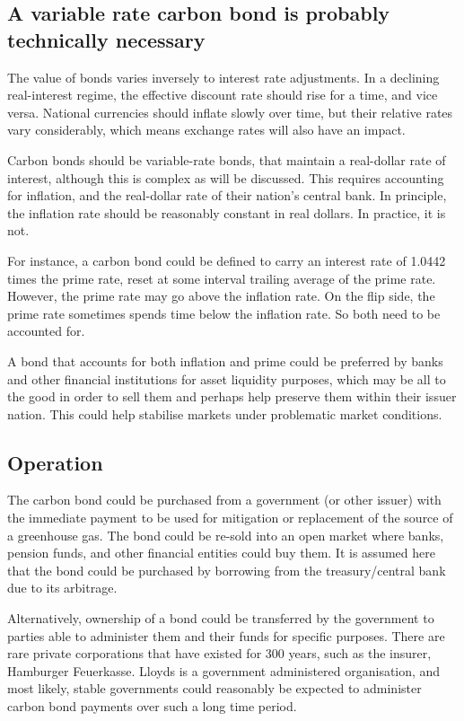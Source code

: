 \documentclass{article}
\begin{document}
\subsection{A variable rate carbon bond is probably technically necessary}

The value of bonds varies inversely to interest rate adjustments. In a declining real-interest regime, the effective discount rate should rise for a time, and vice versa. National currencies should inflate slowly over time, but their relative rates vary considerably, which means exchange rates will also have an impact. 

Carbon bonds should be variable-rate bonds, that maintain a real-dollar rate of interest, although this is complex as will be discussed. This requires accounting for inflation, and the real-dollar rate of  their nation's central bank. In  principle, the inflation rate should be reasonably constant in real dollars. In practice, it is not. 

For instance, a carbon bond could be defined to carry an interest rate of 1.0442 times the prime rate, reset at some interval trailing average of the prime rate. However, the prime rate may go above the inflation rate. On the flip side, the prime rate sometimes spends time below the inflation rate. So both need to be accounted for. 

A bond that accounts for both inflation and prime could be preferred by banks and other financial institutions for asset liquidity purposes, which may be all to the good in order to sell them and perhaps help preserve them within their issuer nation. This could help stabilise markets under problematic market conditions. 

\subsection{Operation}
 The carbon bond could be purchased from a government (or other issuer) with the immediate payment to be used for mitigation or replacement of the source of a greenhouse gas. The bond could be re-sold into an open market where banks, pension funds, and other financial entities could buy them. It is assumed here that the bond could be purchased by borrowing from the treasury/central bank due to its arbitrage. 

Alternatively, ownership of a bond could be transferred by the government to parties able to administer them and their funds for specific purposes. There are rare private corporations that have existed for 300 years, such as the insurer, Hamburger Feuerkasse. Lloyds is a government administered organisation, and most likely, stable governments could reasonably be expected to administer carbon bond payments over such a long time period. 
\end{document}

